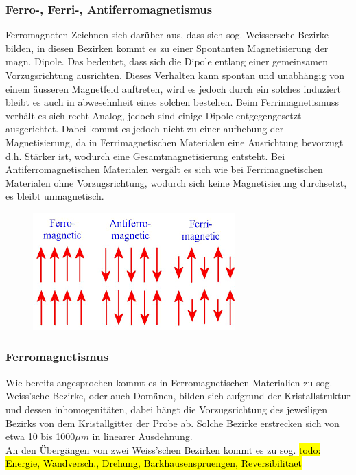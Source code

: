         \subsubsection*{Ferro-, Ferri-, Antiferromagnetismus}
            Ferromagneten Zeichnen sich darüber aus, dass sich sog. Weissersche Bezirke bilden, in diesen Bezirken
            kommt es zu einer Spontanten Magnetisierung der magn. Dipole. Das bedeutet, dass sich die Dipole entlang einer
            gemeinsamen Vorzugsrichtung ausrichten. Dieses Verhalten kann spontan und unabhängig von einem äusseren Magnetfeld
            auftreten, wird es jedoch durch ein solches induziert bleibt es auch in abwesehnheit eines solchen bestehen.
            Beim Ferrimagnetismuss verhält es sich recht Analog, jedoch sind einige Dipole entgegengesetzt ausgerichtet.
            Dabei kommt es jedoch nicht zu einer aufhebung der Magnetisierung, da in Ferrimagnetischen Materialen
            eine Ausrichtung bevorzugt d.h. Stärker ist, wodurch eine Gesamtmagnetisierung entsteht. 
            Bei Antiferromagnetischen Materialen vergält es sich wie bei Ferrimagnetischen Materialen ohne Vorzugsrichtung,
            wodurch sich keine Magnetisierung durchsetzt, es bleibt unmagnetisch.
            \begin{figure}[H]
                \centering
                \includegraphics{Images/ferroferrianti.png}
            \end{figure}
        \subsubsection*{Ferromagnetismus}
            Wie bereits angesprochen kommt es in Ferromagnetischen Materialien zu sog. Weiss'sche Bezirke,
            oder auch Domänen, bilden sich aufgrund der Kristallstruktur und dessen inhomogenitäten, dabei 
            hängt die Vorzugsrichtung des jeweiligen Bezirks von dem Kristallgitter der Probe ab. Solche 
            Bezirke erstrecken sich von etwa 10 bis 1000$\mu m$ in linearer Ausdehnung.\\
            An den Übergängen von zwei Weiss'schen Bezirken kommt es zu sog. 
            \hl{todo: Energie, Wandversch., Drehung, Barkhausenspruengen, Reversibilitaet}
